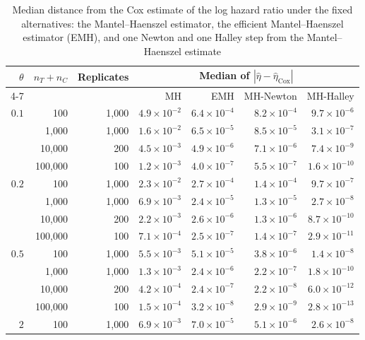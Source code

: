 \begin{table}
\caption{Median distance from the Cox estimate of the log hazard ratio under the fixed alternatives: the Mantel--Haenszel estimator, the efficient Mantel--Haenszel estimator (EMH), and one Newton and one Halley step from the Mantel--Haenszel estimate}
\label{tab:emh}
\centering
\footnotesize
\begin{tabular}{rrrrrrr}
\toprule
$\theta$ & $n_T + n_C$ & Replicates & \multicolumn{4}{c}{Median of $|\hat{\eta} - \hat{\eta}_{\mathrm{Cox}}|$} \\
\cmidrule(lr){4-7}
 & & & MH & EMH & MH-Newton & MH-Halley \\
\midrule
$0.1$ & 100 & 1,000 & $4.9 \times 10^{-2}$ & $6.4 \times 10^{-4}$ & $8.2 \times 10^{-4}$ & $9.7 \times 10^{-6}$ \\
 & 1,000 & 1,000 & $1.6 \times 10^{-2}$ & $6.5 \times 10^{-5}$ & $8.5 \times 10^{-5}$ & $3.1 \times 10^{-7}$ \\
 & 10,000 & 200 & $4.5 \times 10^{-3}$ & $4.9 \times 10^{-6}$ & $7.1 \times 10^{-6}$ & $7.4 \times 10^{-9}$ \\
 & 100,000 & 100 & $1.2 \times 10^{-3}$ & $4.0 \times 10^{-7}$ & $5.5 \times 10^{-7}$ & $1.6 \times 10^{-10}$ \\
\midrule
$0.2$ & 100 & 1,000 & $2.3 \times 10^{-2}$ & $2.7 \times 10^{-4}$ & $1.4 \times 10^{-4}$ & $9.7 \times 10^{-7}$ \\
 & 1,000 & 1,000 & $6.9 \times 10^{-3}$ & $2.4 \times 10^{-5}$ & $1.3 \times 10^{-5}$ & $2.7 \times 10^{-8}$ \\
 & 10,000 & 200 & $2.2 \times 10^{-3}$ & $2.6 \times 10^{-6}$ & $1.3 \times 10^{-6}$ & $8.7 \times 10^{-10}$ \\
 & 100,000 & 100 & $7.1 \times 10^{-4}$ & $2.5 \times 10^{-7}$ & $1.4 \times 10^{-7}$ & $2.9 \times 10^{-11}$ \\
\midrule
$0.5$ & 100 & 1,000 & $5.5 \times 10^{-3}$ & $5.1 \times 10^{-5}$ & $3.8 \times 10^{-6}$ & $1.4 \times 10^{-8}$ \\
 & 1,000 & 1,000 & $1.3 \times 10^{-3}$ & $2.4 \times 10^{-6}$ & $2.2 \times 10^{-7}$ & $1.8 \times 10^{-10}$ \\
 & 10,000 & 200 & $4.2 \times 10^{-4}$ & $2.4 \times 10^{-7}$ & $2.2 \times 10^{-8}$ & $6.0 \times 10^{-12}$ \\
 & 100,000 & 100 & $1.5 \times 10^{-4}$ & $3.2 \times 10^{-8}$ & $2.9 \times 10^{-9}$ & $2.8 \times 10^{-13}$ \\
\midrule
$2$ & 100 & 1,000 & $6.9 \times 10^{-3}$ & $7.0 \times 10^{-5}$ & $5.1 \times 10^{-6}$ & $2.6 \times 10^{-8}$ \\

\end{tabular}
\end{table}
